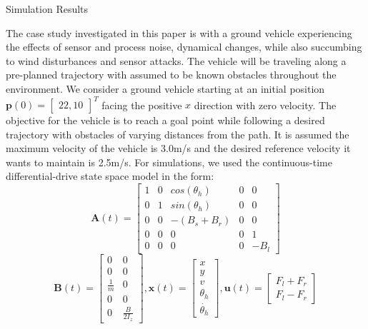 
\begin{section}{Simulation Results}
\label{sec:simulation}


The case study investigated in this paper is with a ground vehicle experiencing the effects of sensor and process noise, dynamical changes, while also succumbing to wind disturbances and sensor attacks. The vehicle will be traveling along a pre-planned trajectory with assumed to be known obstacles throughout the environment. We consider a ground vehicle starting at an initial position $\bm{p}(0)=\begin{bmatrix} 22,10 \end{bmatrix}^T$ facing the positive $x$ direction with zero velocity. The objective for the vehicle is to reach a goal point while following a desired trajectory with obstacles of varying distances from the path. It is assumed the maximum velocity of the vehicle is 3.0m/s and the desired reference velocity it wants to maintain is 2.5m/s. For simulations, we used the continuous-time differential-drive state space model in the form:
    \begin{equation}
	\bm{A}(t)=\begin{bmatrix} 1 & 0 & cos(\theta_h) & 0 & 0 \\ 0 & 1 & sin(\theta_h) & 0 & 0 \\ 0 & 0 & -(B_s+B_r) & 0 & 0 \\ 0 & 0 & 0 & 0 & 1 \\  0 & 0 & 0 & 0 & -B_l \end{bmatrix} \nonumber
	\end{equation}
	\begin{equation}
	\bm{B}(t)=\begin{bmatrix} 0 & 0 \\ 0 & 0 \\ \frac{1}{m} & 0 \\ 0 & 0 \\  0 & \frac{B}{2I_z} \end{bmatrix}, \bm{x}(t)=\begin{bmatrix} x \\ y \\ v \\ \theta_h \\ \dot{\theta_h} \end{bmatrix}, \bm{u}(t)=\begin{bmatrix} F_l+F_r \\ F_l-F_r \end{bmatrix} \nonumber
	\end{equation}





\end{section}
